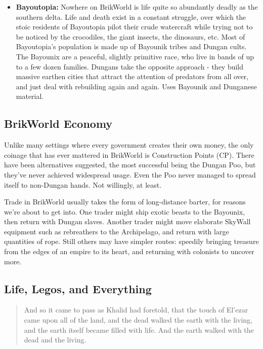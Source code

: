 \documentclass[12pt,a4paper,twocolumn]{article}
\begin{document}
\begin{itemize}
\item {\bf Bayoutopia:} Nowhere on BrikWorld is life quite so abundantly deadly as the southern delta.  Life and death exist in a constant struggle, over which the stoic residents of Bayoutopia pilot their crude watercraft while trying not to be noticed by the crocodiles, the giant insects, the dinosaurs, etc.  Most of Bayoutopia's population is made up of Bayounik tribes and Dungan cults.  The Bayounix are a peaceful, slightly primitive race, who live in bands of up to a few dozen families.  Dungans take the opposite approach - they build massive earthen cities that attract the attention of predators from all over, and just deal with rebuilding again and again.  Uses Bayounik and Dunganese material. 

\end{itemize}

\subsection{BrikWorld Economy}

Unlike many settings where every government creates their own money, the only coinage that has ever mattered in BrikWorld is Construction Points (CP).  There have been alternatives suggested, the most successful being the Dungan Poo, but they've never achieved widespread usage.  Even the Poo never managed to spread itself to non-Dungan hands.  Not willingly, at least.

Trade in BrikWorld usually takes the form of long-distance barter, for reasons we're about to get into.  One trader might ship exotic beasts to the Bayounix, then return with Dungan slaves.  Another trader might move elaborate SkyWall equipment such as rebreathers to the Archipelago, and return with large quantities of rope.  Still others may have simpler routes: speedily bringing treasure from the edges of an empire to its heart, and returning with colonists to uncover more.

\subsection{Life, Legos, and Everything}
\begin{quote}
And so it came to pass as Khalid had foretold, that the touch of El'ezar came upon all of the land, and the dead walked the earth with the living, and the earth itself became filled with life.  And the earth walked with the dead and the living.
\end{quote}
\end{document}
